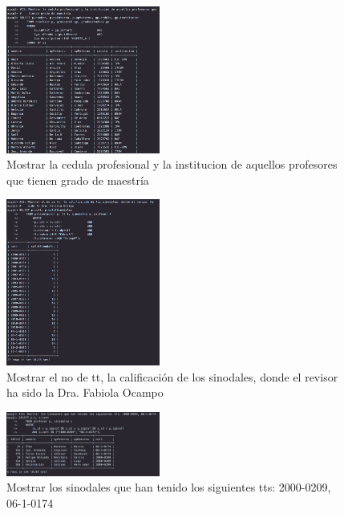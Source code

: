 \documentclass[12pt, fleqn]{article}                             %
\begin{document}
        \begin{figure}[ht!]
            \centering
            \includegraphics[width=0.45\textwidth]{BD4Reporte11}
            \caption{Mostrar la cedula profesional y la institucion de aquellos profesores que
            tienen grado de maestría}
        \end{figure}

        \begin{figure}[ht!]
            \centering
            \includegraphics[width=0.45\textwidth]{BD4Reporte12}
            \caption{Mostrar el no de tt, la calificación de los sinodales, donde el revisor
            ha sido la Dra. Fabiola Ocampo}
        \end{figure}

        \begin{figure}[ht!]
            \centering
            \includegraphics[width=0.45\textwidth]{BD4Reporte13}
            \caption{Mostrar los sinodales que han tenido los siguientes tts: 2000-0209, 06-1-0174}
        \end{figure}
\end{document}
